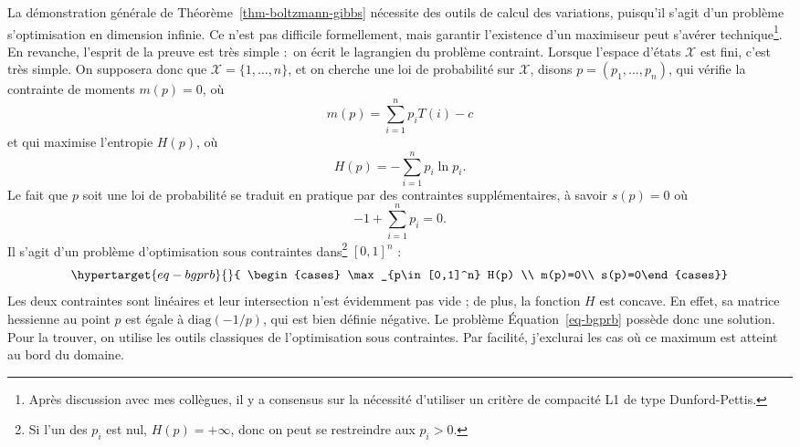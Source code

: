 \documentclass[
  10,
  letterpaper,
  DIV=11,
  numbers=noendperiod]{scrreport}
\theoremstyle{plain}
\theoremstyle{definition}
\theoremstyle{plain}
\theoremstyle{definition}
\theoremstyle{definition}
\theoremstyle{plain}
\theoremstyle{remark}
\begin{document}
La démonstration générale de Théorème~\ref{thm-boltzmann-gibbs}
nécessite des outils de calcul des variations, puisqu'il s'agit d'un
problème s'optimisation en dimension infinie. Ce n'est pas difficile
formellement, mais garantir l'existence d'un maximiseur peut s'avérer
technique\footnote{Après discussion avec mes collègues, il y a consensus
  sur la nécessité d'utiliser un critère de compacité L1 de type
  Dunford-Pettis.}. En revanche, l'esprit de la preuve est très simple
:~on écrit le lagrangien du problème contraint. Lorsque l'espace d'états
\(\mathcal{X}\) est fini, c'est très simple. On supposera donc que
\(\mathcal{X} = \{1, \dotsc, n\}\), et on cherche une loi de probabilité
sur \(\mathcal{X}\), disons \(p=(p_1, \dotsc, p_n)\), qui vérifie la
contrainte de moments \(m(p)=0\), où
\[ m(p) = \sum_{i=1}^n p_i T(i) - c\] et qui maximise l'entropie
\(H(p)\), où \[H(p)= -\sum_{i=1}^n p_i \ln p_i.\] Le fait que \(p\) soit
une loi de probabilité se traduit en pratique par des contraintes
supplémentaires, à savoir \(s(p)=0\) où \[ -1 + \sum_{i=1}^n p_i = 0. \]
Il s'agit d'un problème d'optimisation sous contraintes dans\footnote{Si
  l'un des \(p_i\) est nul, \(H(p)=+\infty\), donc on peut se
  restreindre aux \(p_i >0\).} \([0,1]^n\) :~
\begin{equation}\protect\hypertarget{eq-bgprb}{}{ \begin{cases} \max_{p\in [0,1]^n} H(p) \\
m(p)=0\\
s(p)=0\end{cases}}\label{eq-bgprb}\end{equation} Les deux contraintes
sont linéaires et leur intersection n'est évidemment pas vide ; de plus,
la fonction \(H\) est concave. En effet, sa matrice hessienne au point
\(p\) est égale à \(\mathrm{diag}(-1/p)\), qui est bien définie
négative. Le problème Équation~\ref{eq-bgprb} possède donc une solution.
Pour la trouver, on utilise les outils classiques de l'optimisation sous
contraintes. Par facilité, j'exclurai les cas où ce maximum est atteint
au bord du domaine.
\end{document}
